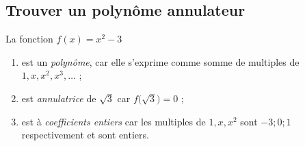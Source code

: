 %
%
%
%
%
%
%
%
%
%
%

\subsection*{Trouver un polynôme annulateur}


La fonction $f(x) = x^2 - 3$ 
	\begin{enumerate}
		\item est un \emph{polynôme}, car elle s'exprime comme somme de multiples de $1, x, x^2, x^3, \hdots$ ; 
		\item est \emph{annulatrice} de $\sqrt3$ car $f\bigl(\sqrt3\bigr) = 0$ ;
		\item est à \emph{coefficients entiers} car les multiples de $1, x, x^2$ sont $-3 ; 0 ; 1$ respectivement et sont entiers.
	\end{enumerate}
	
